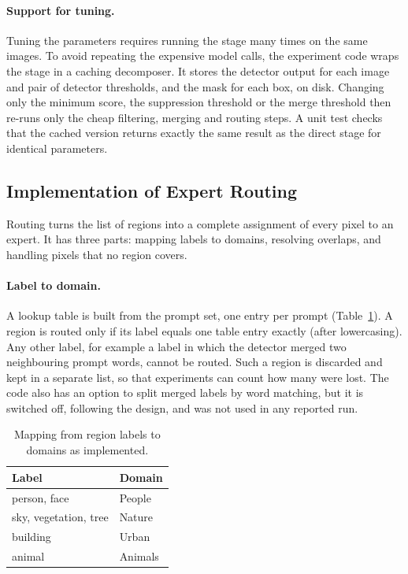 \documentclass{FastFyp}
\begin{document}
\paragraph{Support for tuning.} Tuning the parameters requires running the stage many times on the same images. To avoid repeating the expensive model calls, the experiment code wraps the stage in a caching decomposer. It stores the detector output for each image and pair of detector thresholds, and the mask for each box, on disk. Changing only the minimum score, the suppression threshold or the merge threshold then re-runs only the cheap filtering, merging and routing steps. A unit test checks that the cached version returns exactly the same result as the direct stage for identical parameters.
 
\subsection{Implementation of Expert Routing}
\label{sec:a_routing}
Routing turns the list of regions into a complete assignment of every pixel to an expert. It has three parts: mapping labels to domains, resolving overlaps, and handling pixels that no region covers.

\paragraph{Label to domain.} A lookup table is built from the prompt set, one entry per prompt (Table~\ref{tab:a_label_map}). A region is routed only if its label equals one table entry exactly (after lowercasing). Any other label, for example a label in which the detector merged two neighbouring prompt words, cannot be routed. Such a region is discarded and kept in a separate list, so that experiments can count how many were lost. The code also has an option to split merged labels by word matching, but it is switched off, following the design, and was not used in any reported run.

\begin{table}[!ht]
\centering
\caption{Mapping from region labels to domains as implemented.}
\label{tab:a_label_map}
\begin{tabular}{|l|l|}
\hline
\textbf{Label} & \textbf{Domain} \\ \hline
person, face & People \\ \hline
sky, vegetation, tree & Nature \\ \hline
building & Urban \\ \hline
animal & Animals \\ \hline
\end{tabular}
\end{table}
\end{document}
